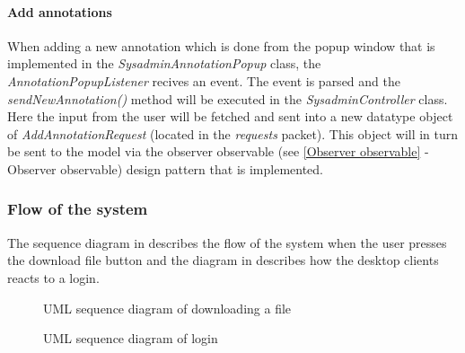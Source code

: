 \paragraph{Add annotations}
When adding a new annotation which is done from the popup window that is implemented in the \textit{SysadminAnnotationPopup} class, the \textit{AnnotationPopupListener} recives an event. The event is parsed and the \textit{sendNewAnnotation()} method will be executed in the \textit{SysadminController} class. Here the input from the user will be fetched and sent into a new datatype object of \textit{AddAnnotationRequest} (located in the \textit{requests} packet). This object will in turn be sent to the model via the observer observable (see \ref{Observer observable} - Observer observable) design pattern that is implemented. 



\subsubsection{Flow of the system}

The sequence diagram in  describes the flow of the system when the user presses the download file button and the diagram in  describes how the desktop clients reacts to a login.





\begin{figure}[htb!]
	\caption{UML sequence diagram of downloading a file}
	\label{fig:des_download-sequence}
\end{figure}

\begin{figure}[htb!]
	\caption{UML sequence diagram of login}
	\label{fig:des_login-sequence}
\end{figure}
\FloatBarrier
